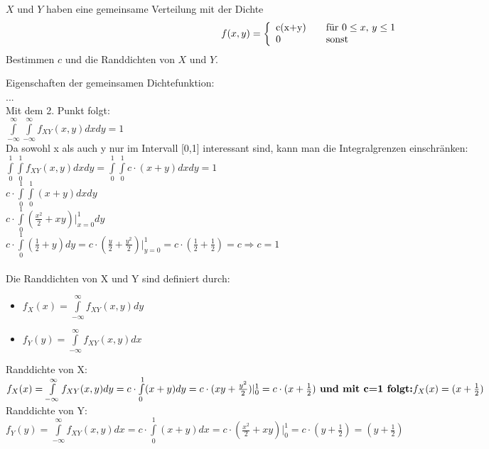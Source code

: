 \begin{uebsp}
\begin{Exercise}[label=ex:2.6]
$X$ und $Y$ haben eine gemeinsame Verteilung mit der Dichte \\
\[ f(x,y) = \left\{
  \begin{array}{l l}
    $c(x+y)$ & \quad \text{für $0 \le x$, $y \le 1$}\\
    0  & \quad \text{sonst} \\
  \end{array} \right.\]
Bestimmen $c$ und die Randdichten von $X$ und $Y$.
\end{Exercise}
\begin{Answer}
Eigenschaften der gemeinsamen Dichtefunktion: \\

...\\

Mit dem 2. Punkt folgt: \\
$\int\limits_{-\infty}^\infty \int\limits_{-\infty}^\infty f_{XY}(x,y)dxdy=1$ \\
Da sowohl x als auch y nur im Intervall [0,1] interessant sind, kann man die Integralgrenzen einschränken:\\

$\int\limits_{0}^{1} \int\limits_{0}^{1} f_{XY}(x,y)dxdy=\int\limits_{0}^{1} \int\limits_{0}^{1} c \cdot (x+y)dxdy = 1$\\
$c \cdot \int\limits_{0}^{1} \int\limits_{0}^{1} (x+y)dxdy$\\
$c \cdot \int\limits_{0}^{1}( \frac{x^2}{2}+xy )|_{x=0}^{1} dy$\\
$c \cdot \int\limits_{0}^{1} (\frac{1}{2}+y )dy = c \cdot (\frac{y}{2}+\frac{y^2}{2})|_{y=0}^{1} = c \cdot (\frac{1}{2}+\frac{1}{2})=c \Rightarrow c=1$\\ \\

Die Randdichten von X und Y sind definiert durch:

\begin{itemize}
\item $f_X(x)=\int\limits_{-\infty}^\infty f_{XY}(x,y)dy$
\item $f_Y(y)=\int\limits_{-\infty}^\infty f_{XY}(x,y)dx$
\end{itemize} 

Randdichte von X:\\
$f_X(x)=\int\limits_{-\infty}^\infty f_{XY}(x,y)dy = c \cdot \int\limits_{0}^1 (x+y) dy = c \cdot (xy + \frac{y^2}{2})|_{0}^1 = c \cdot (x+\frac{1}{2}) \textbf{ und mit c=1 folgt:}\\ f_X(x)= (x+\frac{1}{2})$ \\

Randdichte von Y:\\
$f_Y(y)=\int\limits_{-\infty}^\infty f_{XY}(x,y)dx =c \cdot \int\limits_{0}^1 (x+y) dx = c \cdot (\frac{x^2}{2} + xy )|_{0}^1 = c \cdot (y+\frac{1}{2})= (y+\frac{1}{2}) $\\



\end{Answer}
\end{uebsp}

